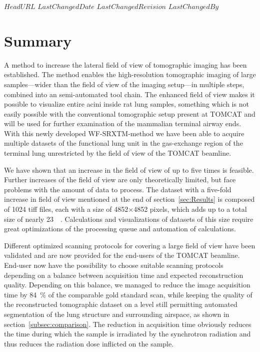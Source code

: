 \svnidlong
{$HeadURL$}
{$LastChangedDate$}
{$LastChangedRevision$}
{$LastChangedBy$}
%
\section{Summary}\label{summary}

A method to increase the lateral field of view of tomographic imaging has been established. The method enables the high-resolution tomographic imaging of large samples---wider than the field of view of the imaging setup---in multiple steps, combined into an semi-automated tool chain. The enhanced field of view makes it possible to visualize entire acini inside rat lung samples, something which is not easily possible with the conventional tomographic setup present at TOMCAT and will be used for further examination of the mammalian terminal airway ends. With this newly developed WF-SRXTM-method we have been able to acquire multiple datasets of the functional lung unit in the gas-exchange region of the terminal lung unrestricted by the field of view of the TOMCAT beamline.

We have shown that an increase in the field of view of up to five times is feasible. Further increases of the field of view are only theoretically limited, but face problems with the amount of data to process. The dataset with a five-fold increase in field of view mentioned at the end of section~\ref{sec:Results} is composed of 1024 tiff files, each with a size of 4852$\times$4852 pixels, which adds up to a total size of nearly \SI{23}{\giga\byte}. Calculations and visualizations of datasets of this size require great optimizations of the processing queue and automation of calculations.

Different optimized scanning protocols for covering a large field of view have been validated and are now provided for the end-users of the TOMCAT beamline. End-user now have the possibility to choose suitable scanning protocols depending on a balance between acquisition time and expected reconstruction quality. Depending on this balance, we managed to reduce the image acquisition time by \SI{84}{\percent} of the comparable gold standard scan, while keeping the quality of the reconstructed tomographic dataset on a level still permitting automated segmentation of the lung structure and surrounding airspace, as shown in section~\ref{subsec:comparison}. The reduction in acquisition time obviously reduces the time during which the sample is irradiated by the synchrotron radiation and thus reduces the radiation dose inflicted on the sample.